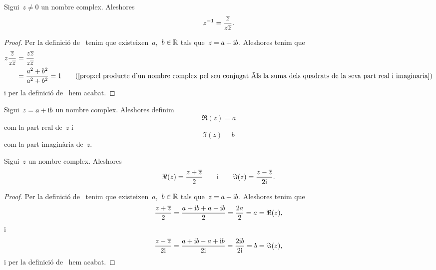 \documentclass[../Apunts.tex]{subfiles}
\begin{document}
	\begin{proposition}
		\label{prop:inversa d'un nombre complex en funció del seu conjugat}
		Sigui~\(z\neq0\) un nombre complex.
		Aleshores
		\[z^{-1}=\frac{\overline{z}}{z\overline{z}}.\]
	\end{proposition}
	\begin{proof}
		Per la definició de~ tenim que
		existeixen~\(a\),~\(b\in\mathbb{R}\) tals que~\(z=a+\mathrm{i} b\).
		Aleshores tenim que
		\begin{align*}
			z\frac{\conjugat{z}}{z\conjugat{z}}
			&=\frac{z\conjugat{z}}{z\conjugat{z}} \\
			&=\frac{a^{2}+b^{2}}{a^{2}+b^{2}}=1
			\tag{\ref{prop:el producte d'un nombre complex pel seu conjugat %
			és la suma dels quadrats de la seva part real i imaginaria}}
		\end{align*}
		i per la definició de~
		hem acabat.
	\end{proof}
	\begin{definition}
		\label{def:part real i part imaginària d'un nombre complex}
		\label{def:part real d'un nombre complex}
		\label{def:part imaginària d'un nombre complex}
		Sigui~\(z=a+\mathrm{i} b\) un nombre complex.
		Aleshores definim
		\[\Re(z)=a\]
		com la part real de~\(z\) i
		\[\Im(z)=b\]
		com la part imaginària de~\(z\).
	\end{definition}
	\begin{proposition}
		\label{prop:fórmules per la part real i part imaginària d'un nombre complex}
		\label{prop:fórmula per la part real d'un nombre complex}
		\label{prop:fórmula per la part imaginària d'un nombre complex}
		Sigui~\(z\) un nombre complex.
		Aleshores
		\[
			\Re(z)=\frac{z+\overline{z}}{2}
			\qquad\text{i}\qquad
			\Im(z)=\frac{z-\overline{z}}{2\mathrm{i}}.
		\]
	\end{proposition}
	\begin{proof}
		Per la definició de~ tenim que
		existeixen~\(a\),~\(b\in\mathbb{R}\) tals que~\(z=a+\mathrm{i} b\).
		Aleshores tenim que
		\[
			\frac{z+\overline{z}}{2}
			=\frac{a+\mathrm{i} b+a-\mathrm{i} b}{2}
			=\frac{2a}{2}
			=a
			=\Re(z),
		\]
		i
		\[
			\frac{z-\overline{z}}{2\mathrm{i}}
			=\frac{a+\mathrm{i} b-a+\mathrm{i} b}{2\mathrm{i}}
			=\frac{2\mathrm{i} b}{2\mathrm{i}}
			=b
			=\Im(z),
		\]
		i per la definició
		de~
		hem acabat.
	\end{proof}
\end{document}
